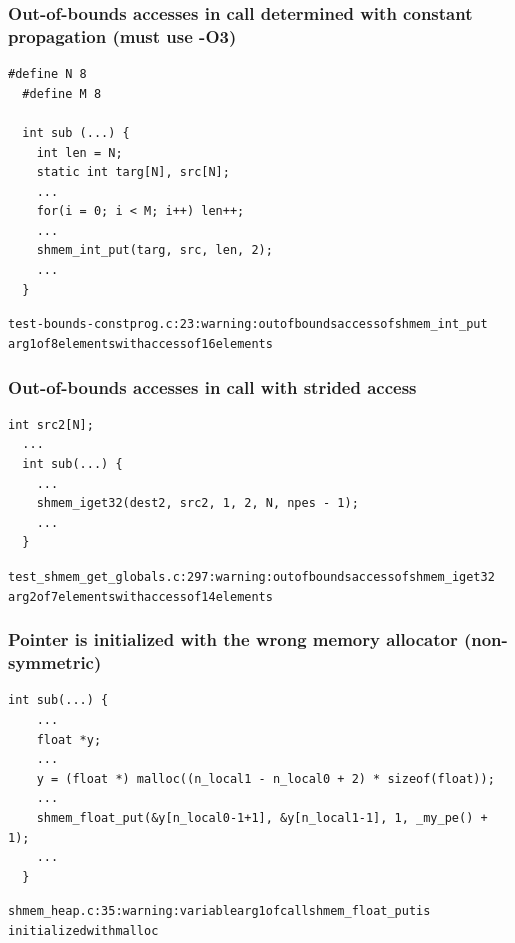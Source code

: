 \vspace{0.2in}

\begin{minipage}{\linewidth}
\subsubsection{Out-of-bounds accesses in \openshmem call determined with constant propagation (must use -O3)}

\begin{lstlisting}[language=OSH+C]
  #define N 8
  #define M 8

  int sub (...) {
    int len = N;
    static int targ[N], src[N];
    ...
    for(i = 0; i < M; i++) len++;
    ...
    shmem_int_put(targ, src, len, 2);
    ...
  }     
\end{lstlisting}
\begin{alltt}
  test-bounds-constprog.c:23: warning: out of bounds access of shmem_int_put
  arg1 of 8 elements with access of 16 elements
\end{alltt}
\end{minipage}

\vspace{0.2in}

\begin{minipage}{\linewidth}
\subsubsection{Out-of-bounds accesses in \openshmem call with strided access}

\begin{lstlisting}[language=OSH+C]
  int src2[N];
  ...
  int sub(...) {
    ...
    shmem_iget32(dest2, src2, 1, 2, N, npes - 1);
    ...
  }
\end{lstlisting}
\begin{alltt}
  test_shmem_get_globals.c:297: warning: out of bounds access of shmem_iget32
  arg2 of 7 elements with access of 14 elements
\end{alltt}
\end{minipage}

\vspace{0.2in}

\begin{minipage}{\linewidth}
\subsubsection{Pointer is initialized with the wrong memory allocator (non-symmetric)}

\begin{lstlisting}[language=OSH+C]
  int sub(...) {
    ...
    float *y;
    ...
    y = (float *) malloc((n_local1 - n_local0 + 2) * sizeof(float));
    ...
    shmem_float_put(&y[n_local0-1+1], &y[n_local1-1], 1, _my_pe() + 1);
    ...
  } 
\end{lstlisting}
\begin{alltt}
  shmem_heap.c:35: warning: variable arg1 of call shmem_float_put is
  initialized with malloc
\end{alltt}
\end{minipage}

